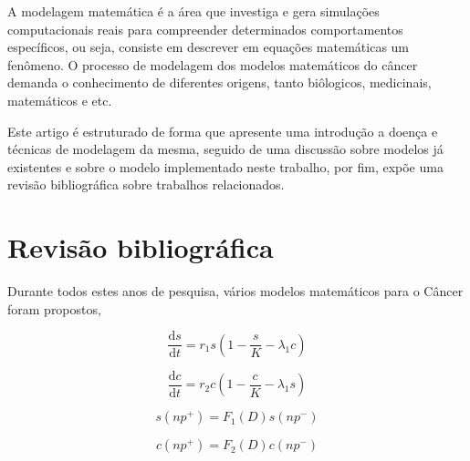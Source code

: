 \documentclass[12pt]{article}
\begin{document}
A modelagem matemática é a área que investiga e gera simulações computacionais reais para compreender determinados comportamentos específicos, ou seja, consiste em descrever em equações matemáticas um fenômeno.
O processo de modelagem dos modelos matemáticos do câncer demanda o conhecimento de diferentes origens, tanto biôlogicos, medicinais, matemáticos e etc.


Este artigo é estruturado de forma que apresente uma introdução a doença e técnicas de modelagem da mesma, seguido de uma discussão sobre modelos já existentes e sobre o modelo implementado neste trabalho, por fim, expõe uma revisão bibliográfica sobre trabalhos relacionados.

\section{Revisão bibliográfica} \label{sec:relatedwork} %
Durante todos estes anos de pesquisa, vários modelos matemáticos para o Câncer foram propostos,

\begin{equation} \label{eq:normalgrowth}
  \frac{\mathrm{d} s}{\mathrm{d} t} = r_{1} s \left ( 1 - \frac{s}{K} - \lambda_{1} c \right )
\end{equation}

\begin{equation} \label{eq:cancergrowth}
  \frac{\mathrm{d} c}{\mathrm{d} t} = r_{2} c \left ( 1 - \frac{c}{K} - \lambda_{1} s \right )
\end{equation}

\begin{equation}
  s(np^{+}) = F_{1}(D) s(np^{-})
\end{equation}

\begin{equation}
  c(np^{+}) = F_{2}(D) c(np^{-})
\end{equation}
\end{document}
